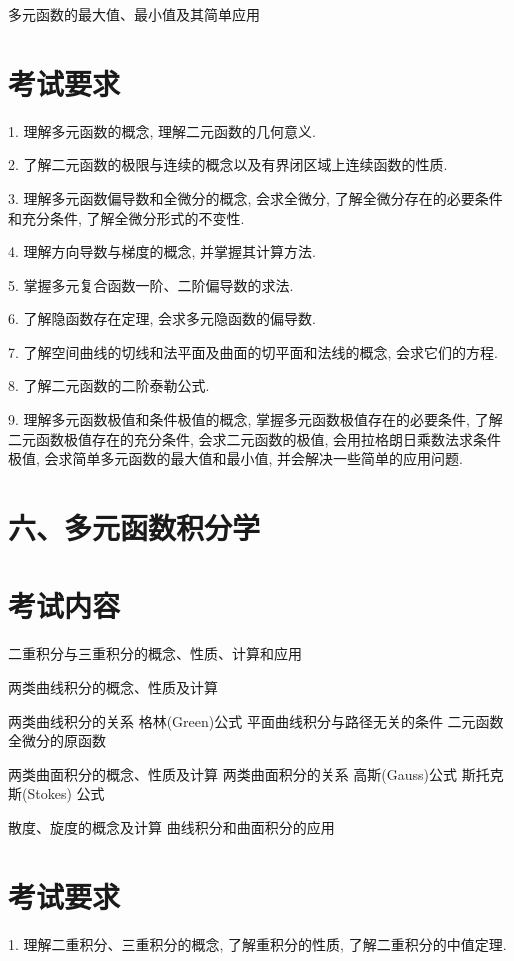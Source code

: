 \documentclass[10pt]{article}
\begin{document}
多元函数的最大值、最小值及其简单应用

\section*{考试要求}

1. 理解多元函数的概念, 理解二元函数的几何意义.

2. 了解二元函数的极限与连续的概念以及有界闭区域上连续函数的性质.

3. 理解多元函数偏导数和全微分的概念, 会求全微分, 了解全微分存在的必要条件和充分条件, 了解全微分形式的不变性.

4. 理解方向导数与梯度的概念, 并掌握其计算方法.

5. 掌握多元复合函数一阶、二阶偏导数的求法.

6. 了解隐函数存在定理, 会求多元隐函数的偏导数.

7. 了解空间曲线的切线和法平面及曲面的切平面和法线的概念, 会求它们的方程.

8. 了解二元函数的二阶泰勒公式.

9. 理解多元函数极值和条件极值的概念, 掌握多元函数极值存在的必要条件, 了解二元函数极值存在的充分条件, 会求二元函数的极值, 会用拉格朗日乘数法求条件极值, 会求简单多元函数的最大值和最小值, 并会解决一些简单的应用问题.

\section*{六、多元函数积分学}

\section*{考试内容}

二重积分与三重积分的概念、性质、计算和应用 

两类曲线积分的概念、性质及计算 

两类曲线积分的关系 格林(Green)公式 平面曲线积分与路径无关的条件 二元函数全微分的原函数 

两类曲面积分的概念、性质及计算 两类曲面积分的关系 高斯(Gauss)公式 斯托克斯(Stokes) 公式 

散度、旋度的概念及计算 曲线积分和曲面积分的应用

\section*{考试要求}

1. 理解二重积分、三重积分的概念, 了解重积分的性质, 了解二重积分的中值定理.
\end{document}
